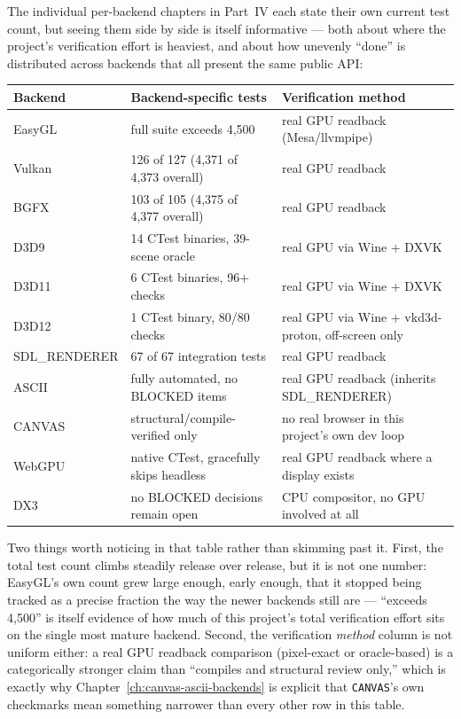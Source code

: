 The individual per-backend chapters in Part~IV each state their own current test count, but
seeing them side by side is itself informative --- both about where the project's
verification effort is heaviest, and about how unevenly ``done'' is distributed across
backends that all present the same public API:

\begin{center}
\small
\begin{tabularx}{\textwidth}{lXX}
\toprule
\textbf{Backend} & \textbf{Backend-specific tests} & \textbf{Verification method} \\
\midrule
EasyGL & full suite exceeds 4{,}500 & real GPU readback (Mesa/llvmpipe) \\
Vulkan & 126 of 127 (4{,}371 of 4{,}373 overall) & real GPU readback \\
BGFX & 103 of 105 (4{,}375 of 4{,}377 overall) & real GPU readback \\
D3D9 & 14 CTest binaries, 39-scene oracle & real GPU via Wine + DXVK \\
D3D11 & 6 CTest binaries, 96+ checks & real GPU via Wine + DXVK \\
D3D12 & 1 CTest binary, 80/80 checks & real GPU via Wine + vkd3d-proton, off-screen only \\
SDL\_RENDERER & 67 of 67 integration tests & real GPU readback \\
ASCII & fully automated, no BLOCKED items & real GPU readback (inherits SDL\_RENDERER) \\
CANVAS & structural/compile-verified only & no real browser in this project's own dev loop \\
WebGPU & native CTest, gracefully skips headless & real GPU readback where a display exists \\
DX3 & no BLOCKED decisions remain open & CPU compositor, no GPU involved at all \\
\bottomrule
\end{tabularx}
\end{center}

Two things worth noticing in that table rather than skimming past it. First, the total test
count climbs steadily release over release, but it is not one number: EasyGL's own count grew
large enough, early enough, that it stopped being tracked as a precise fraction the way the
newer backends still are --- ``exceeds 4{,}500'' is itself evidence of how much of this
project's total verification effort sits on the single most mature backend. Second, the
verification \emph{method} column is not uniform either: a real GPU readback comparison
(pixel-exact or oracle-based) is a categorically stronger claim than ``compiles and structural
review only,'' which is exactly why Chapter~\ref{ch:canvas-ascii-backends} is explicit that
\texttt{CANVAS}'s own checkmarks mean something narrower than every other row in this table.

